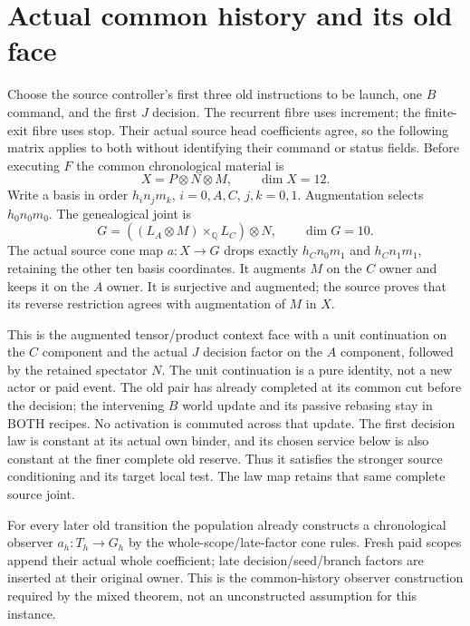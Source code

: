 \documentclass{article}
\begin{document}
\section{Actual common history and its old face}
Choose the source controller's first three old instructions to be launch, one $B$ command, and the first $J$ decision. The recurrent fibre uses increment; the finite-exit fibre uses stop. Their actual source head coefficients agree, so the following matrix applies to both without identifying their command or status fields. Before executing $F$ the common chronological material is
\[
 X=P\otimes N\otimes M,\qquad \dim X=12.
\]
Write a basis in order $h_i n_j m_k$, $i=0,A,C$, $j,k=0,1$. Augmentation selects $h_0n_0m_0$. The genealogical joint is
\[
 G=((L_A\otimes M)\times_{\mathbb Q}L_C)\otimes N,
 \qquad \dim G=10.
\]
The actual source cone map $a:X\to G$ drops exactly $h_Cn_0m_1$ and $h_Cn_1m_1$, retaining the other ten basis coordinates. It augments $M$ on the $C$ owner and keeps it on the $A$ owner. It is surjective and augmented; the source proves that its reverse restriction agrees with augmentation of $M$ in $X$.

This is the augmented tensor/product context face with a unit continuation on the $C$ component and the actual $J$ decision factor on the $A$ component, followed by the retained spectator $N$. The unit continuation is a pure identity, not a new actor or paid event. The old pair has already completed at its common cut before the decision; the intervening $B$ world update and its passive rebasing stay in BOTH recipes. No activation is commuted across that update. The first decision law is constant at its actual own binder, and its chosen service below is also constant at the finer complete old reserve. Thus it satisfies the stronger source conditioning and its target local test. The law map retains that same complete source joint.

For every later old transition the population already constructs a chronological observer $a_h:T_h\to G_h$ by the whole-scope/late-factor cone rules. Fresh paid scopes append their actual whole coefficient; late decision/seed/branch factors are inserted at their original owner. This is the common-history observer construction required by the mixed theorem, not an unconstructed assumption for this instance.
\end{document}
